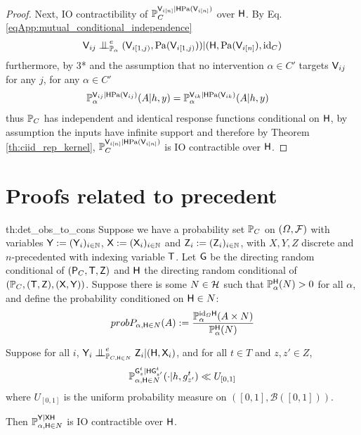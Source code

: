 \begin{proof}
Next, IO contractibility of $\mathbb{P}_C^{\mathsf{V}_{i[n]}|\mathsf{H}\mathrm{Pa}(\mathsf{V}_{i [n]})}$ over $\mathsf{H}$. By Eq. \eqref{eqApp:mutual_conditional_independence}
\begin{align}
    \RV{V}_{ij}\CI^e_{\prob{P}_{\alpha}} (\RV{V}_{i [1,j)},\mathrm{Pa}(\RV{V}_{i [1,j)}) )|(\RV{H},\mathrm{Pa}(\RV{V}_{i[n]}),\text{id}_C)
\end{align}
furthermore, by 3* and the assumption that no intervention $\alpha\in C'$ targets $\mathsf{V}_{ij}$ for any $j$, for any $\alpha\in C'$
\begin{align}
    \mathbb{P}_{\alpha}^{\mathsf{V}_{ij}|\mathsf{H}\mathrm{Pa}(\mathsf{V}_{ij})}(A|h,y) &= \mathbb{P}_{\alpha}^{\mathsf{V}_{ik}|\mathsf{H}\mathrm{Pa}(\mathsf{V}_{ik})}(A|h,y) 
\end{align}
thus $\mathbb{P}_C$ has independent and identical response functions conditional on $\mathsf{H}$, by assumption the inputs have infinite support and therefore by Theorem \ref{th:ciid_rep_kernel}, $\mathbb{P}_C^{\mathsf{V}_{i[n]}|\mathsf{H}\mathrm{Pa}(\mathsf{V}_{i [n]})}$ is IO contractible over $\mathsf{H}$.
\end{proof}

\section{Proofs related to precedent}\label{sec:proof_precedent}


\begin{reptheorem}{th:det_obs_to_cons}
Suppose we have a probability set $\mathbb{P}_C$ on $(\Omega,\mathcal{F})$ with variables $\mathsf{Y}:=(\mathsf{Y}_i)_{i\in \mathbb{N}}$, $\mathsf{X}:=(\mathsf{X}_i)_{i\in \mathbb{N}}$ and $\mathsf{Z}_i:= (\mathsf{Z}_i)_{i\in \mathbb{N}}$, with $X,Y,Z$ discrete and $n$-precedented with indexing variable $\mathsf{T}$. Let $\mathsf{G}$ be the directing random conditional of $(\mathsf{P}_C,\mathsf{T},\mathsf{Z})$ and $\mathsf{H}$ the directing random conditional of $(\mathbb{P}_C,(\mathsf{T},\mathsf{Z}),(\mathsf{X},\mathsf{Y}))$. Suppose there is some $N\in\mathcal{H}$ such that $\mathbb{P}_\alpha^{\mathsf{H}}(N)>0$ for all $\alpha$, and define the probability conditioned on $\mathsf{H}\in N$:
\begin{align}
prob{P}_{\alpha,\mathsf{H}\in N} (A):= \frac{\mathbb{P}_\alpha^{\text{id}_\Omega \mathsf{H}}(A\times N)}{\mathbb{P}_\alpha^{\mathsf{H}}(N)}
\end{align}

Suppose for all $i$, $\RV{Y}_i\CI^e_{\prob{P}_{C,\RV{H}\in N}} \RV{Z}_i|(\RV{H},\RV{X}_i)$, and for all $t\in T$ and $z,z'\in Z$,
\begin{align}
    \mathbb{P}_{\alpha,\mathsf{H}\in N}^{\mathsf{G}^t_{z}|\mathsf{H}\mathsf{G}^t_{z'}}(\cdot|h,g^t_{z'}) \ll U_{[0,1]}\label{eqApp:lebesgue_dom}
\end{align}
where $U_{[0,1]}$ is the uniform probability measure on $([0,1],\mathcal{B}([0,1]))$.

Then $\mathbb{P}_{\alpha,\mathsf{H}\in N}^{\mathsf{Y}|\mathsf{X}\mathsf{H}}$ is IO contractible over $\mathsf{H}$.
\end{reptheorem}

